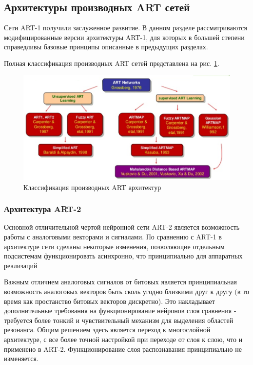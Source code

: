 \documentclass[14pt,a4paper,report]{article}
\begin{document}
\subsection{Архитектуры производных ART сетей}

Сети ART-1 получили заслуженное развитие. В данном разделе рассматриваются модифицированные версии архитектуры ART-1, для которых в большей степени справедливы базовые принципы описанные в предыдущих разделах.

Полная классификация производных ART сетей представлена на рис. \ref{art-tree}.

\begin{figure}[h!]
	\centering
	\includegraphics[scale = 0.72]{images/7.png}
	\caption{Классификация производных ART архитектур}
	\label{art-tree}
\end{figure}

\subsubsection{Архитектура ART-2}

Основной отличительной чертой нейронной сети ART-2 является возможность работы с аналоговыми векторами и сигналами. По сравнению с ART-1 в архитектуре сети сделаны некоторые изменения, позволяющие отдельным подсистемам функционировать асинхронно, что принципиально для аппаратных реализаций \cite{cite-lek-narod}

Важным отличием аналоговых сигналов от битовых является принципиальная возможность аналоговых векторов быть сколь угодно близкими друг к другу (в то время как простанство битовых векторов дискретно). Это накладывает дополнительные требования на функционирование нейронов слоя сравнения - требуется более тонкий и чувствительный механизм для выделения областей резонанса. Общим решением здесь является переход к многослойной архитектуре, с все более точной настройкой при переходе от слоя к слою, что и применено в ART-2. Функционирование слоя распознавания принципиально не изменяется.
\end{document}
